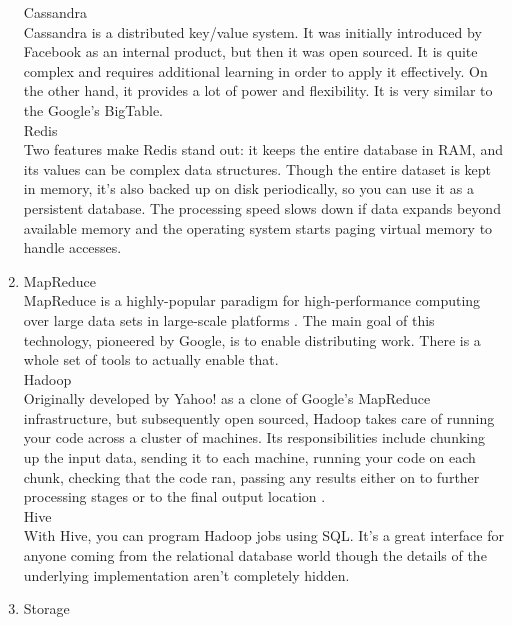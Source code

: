\documentclass[runningheads]{llncs}
\begin{document}
\begin{enumerate}
Cassandra\\

Cassandra is a distributed key/value system. It was initially introduced by Facebook as an internal product, but then it was open sourced. It is quite complex and requires additional learning in order to apply it effectively. On the other hand, it provides a lot of power and flexibility. It is very similar to the Google's BigTable.\\

Redis\\ 

Two features make Redis stand out: it keeps the entire database in RAM, and its values can be complex data structures. Though the entire dataset is kept in memory, it's also backed up on disk periodically, so you can use it as a persistent database. The processing speed slows down if data expands beyond available memory and the operating system starts paging virtual memory to handle accesses.\\

\item MapReduce\\

MapReduce is a highly-popular paradigm for high-performance computing over large data sets in large-scale platforms \cite{MAPREDUCE}. The main goal of this technology, pioneered by Google, is to enable distributing work. There is a whole set of tools to actually enable that.\\ 

Hadoop\\

Originally developed by Yahoo! as a clone of Google's MapReduce infrastructure, but subsequently open sourced, Hadoop takes care of running your code across a cluster of machines. Its responsibilities include chunking up the input data, sending it to each machine, running your code on each chunk, checking that the code ran, passing any
results either on to further processing stages or to the final output location \cite{GLOSSARY}.\\

Hive\\

With Hive, you can program Hadoop jobs using SQL. It's a great interface for anyone coming from the relational database world though the details of the underlying implementation aren't completely hidden.\\

\item Storage\\


\end{enumerate}
\end{document}

